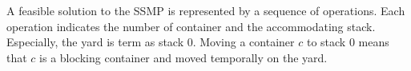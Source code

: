 \documentclass[review,3p,times,authoryear,12pt]{elsarticle}
\newtheorem{proposition}{Proposition}
\begin{document}
A feasible solution to the SSMP is represented by a sequence of operations. Each operation indicates the number of container and the accommodating stack. Especially, the yard is term as stack 0. Moving a container $c$ to stack 0 means that $c$ is a blocking container and moved temporally on the yard.

%
%
%
\end{document}

